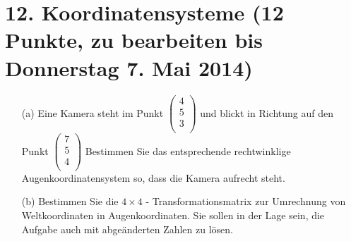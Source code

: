 \documentclass[11pt]{article}
\begin{document}
\section*{12. Koordinatensysteme (12 Punkte, zu bearbeiten bis Donnerstag 7. Mai 2014)}
\begin{enumerate}
\item[(a)] Eine Kamera steht im Punkt
$\begin{pmatrix}
4 \\
5 \\
3 \\
\end{pmatrix}$
und blickt in Richtung auf den Punkt
$\begin{pmatrix}
7 \\
5 \\
4 \\
\end{pmatrix}$
Bestimmen Sie das entsprechende rechtwinklige Augenkoordinatensystem so, dass
die Kamera aufrecht steht.
\item[(b)] Bestimmen Sie die $4 \times 4$ - Transformationsmatrix zur Umrechnung von Weltkoordinaten in Augenkoordinaten. Sie sollen in der Lage sein, die Aufgabe auch mit abgeänderten Zahlen zu lösen.
\end{enumerate}
\end{document}
